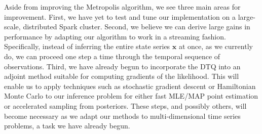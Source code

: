 \documentclass[wcp]{jmlr}
\begin{document}
Aside from improving the Metropolis algorithm, we see three main
areas for improvement.  First, we have yet to test and tune our implementation
on a large-scale, distributed Spark cluster. 
Second, we believe we can derive large gains in performance by
adapting our algorithm to work in a streaming fashion.  Specifically,
instead of inferring the entire state series $\mathbf{x}$ at once, as
we currently do, we can proceed one step a time through the temporal
sequence of observations.  Third, we have already begun to incorporate
the DTQ into an adjoint method suitable for computing gradients of the
likelihood.  This will enable us to apply techniques such as
stochastic gradient descent or Hamiltonian Monte Carlo to our
inference problem for either fast MLE/MAP point estimation or
accelerated sampling from posteriors.  These steps, and possibly
others, will become  necessary as we adapt our methods to
multi-dimensional time series problems, a task we have already begun.



\end{document}
